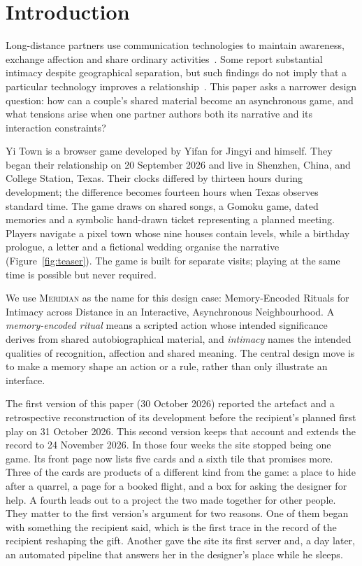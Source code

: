 \documentclass[sigconf,nonacm]{acmart}
\newcommand{\yt}{Yi Town}
\begin{document}

\section{Introduction}
Long-distance partners use communication technologies to maintain awareness, exchange affection
and share ordinary activities~\cite{vetere2005mediating,lottridge2009sharing,neustaedter2012intimacy}.
Some report substantial intimacy despite geographical separation, but such findings do not imply
that a particular technology improves a relationship~\cite{jiang2013absence,stafford2005maintaining}.
This paper asks a narrower design question: how can a couple's shared material become an
asynchronous game, and what tensions arise when one partner authors both its narrative and its
interaction constraints?

\yt{} is a browser game developed by Yifan for Jingyi and himself. They began their relationship
on 20 September 2026 and live in Shenzhen, China, and College Station, Texas. Their clocks differed
by thirteen hours during development; the difference becomes fourteen hours when Texas observes
standard time. The game draws on shared songs, a Gomoku game, dated memories and a symbolic
hand-drawn ticket representing a planned meeting. Players navigate a pixel town whose nine houses
contain levels, while a birthday prologue, a letter and a fictional wedding organise the narrative
(Figure~\ref{fig:teaser}). The game is built for separate visits; playing at the same time is
possible but never required.

We use \textsc{Meridian} as the name for this design case: Memory-Encoded Rituals for Intimacy
across Distance in an Interactive, Asynchronous Neighbourhood. A \emph{memory-encoded ritual}
means a scripted action whose intended significance derives from shared autobiographical material,
and \emph{intimacy} names the intended qualities of recognition, affection and shared meaning.
The central design move is to make a memory shape an action or a rule, rather than only illustrate
an interface.

The first version of this paper (30 October 2026) reported the artefact and a retrospective
reconstruction of its development before the recipient's planned first play on 31 October 2026.
This second version keeps that account and extends the record to 24 November 2026. In those four
weeks the site stopped being one game. Its front page now lists five cards and a sixth tile that promises more. Three of the cards
are products of a different kind from the game: a place to hide after a quarrel, a page for a
booked flight, and a box for asking the designer for help. A fourth leads out to a project the
two made together for other people. They matter to the first version's argument for two
reasons. One of them began with something the recipient said, which is the first trace in the
record of the recipient reshaping the gift. Another gave the site its first server and, a day
later, an automated pipeline that answers her in the designer's place while he sleeps.
\end{document}

